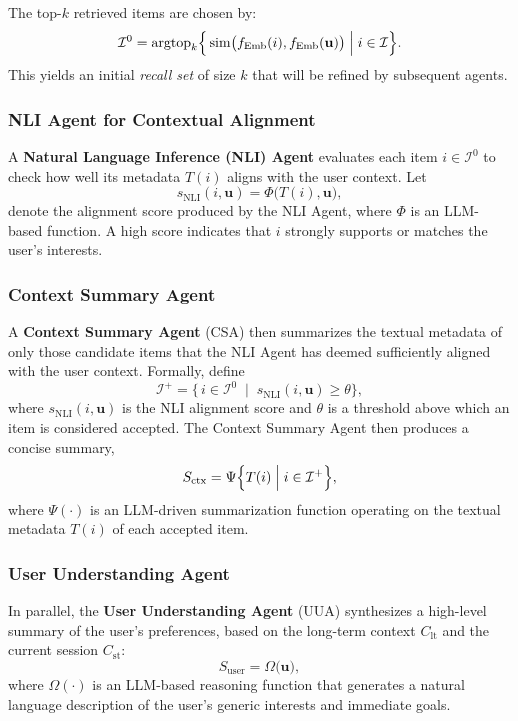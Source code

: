 \documentclass[sigconf]{acmart}
\begin{document}
The top-$k$ retrieved items are chosen by:
\[
    \mathcal{I}^0 
    = \mathrm{argtop}_{k} 
    \Bigl\{\,
    \mathrm{sim}\bigl(f_{\mathrm{Emb}}(i), f_{\mathrm{Emb}}(\mathbf{u})\bigr) 
    \;\Big|\; i \in \mathcal{I}
    \Bigr\}.
\]
This yields an initial \textit{recall set} of size $k$ that will be refined by subsequent agents.

\subsubsection{NLI Agent for Contextual Alignment} A \textbf{Natural Language Inference (NLI) Agent} evaluates each item $i \in \mathcal{I}^0$ to check how well its metadata $T(i)$ aligns with the user context. Let
\[
    s_{\mathrm{NLI}}(i, \mathbf{u}) 
    = \Phi\bigl(T(i), \mathbf{u}\bigr),
\]
denote the alignment score produced by the NLI Agent, where $\Phi$ is an LLM-based function. A high score indicates that $i$ strongly supports or matches the user’s interests.

\subsubsection{Context Summary Agent} A \textbf{Context Summary Agent} (CSA) then summarizes the textual metadata of only those candidate items that the NLI Agent has deemed sufficiently aligned with the user context. Formally, define
\[
    \mathcal{I}^{+} 
    = \{\, i \in \mathcal{I}^{0} \;\mid\; s_{\mathrm{NLI}}(i, \mathbf{u}) \ge \theta \},
\]
where \(s_{\mathrm{NLI}}(i, \mathbf{u})\) is the NLI alignment score and \(\theta\) is a threshold above which an item is considered accepted. The Context Summary Agent then produces a concise summary,
\[
    S_{\mathrm{ctx}} 
    = \Psi\Bigl\{ T(i) \;\Big|\; i \in \mathcal{I}^{+} \Bigr\},
\]
where \(\Psi(\cdot)\) is an LLM-driven summarization function operating on the textual metadata \(T(i)\) of each accepted item.

\subsubsection{User Understanding Agent} In parallel, the \textbf{User Understanding Agent} (UUA) synthesizes a high-level summary of the user’s preferences, based on the long-term context $C_{\mathrm{lt}}$ and the current session $C_{\mathrm{st}}$:
\[
    S_{\mathrm{user}} 
    = \Omega\bigl(\mathbf{u}\bigr),
\]
where $\Omega(\cdot)$ is an LLM-based reasoning function that generates a natural language description of the user’s generic interests and immediate goals.
\end{document}
